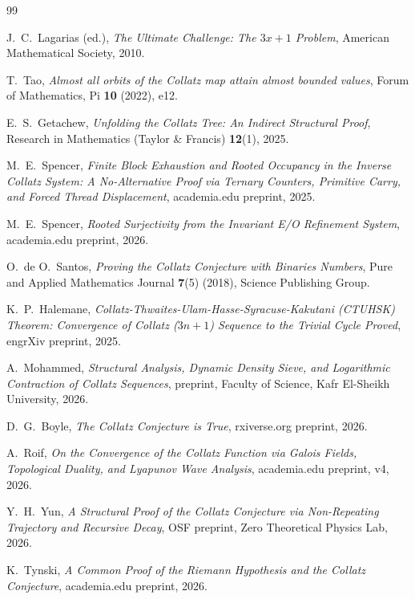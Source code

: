 \documentclass[11pt]{article}
\begin{document}
\begin{thebibliography}{99}

 J.\ C.\ Lagarias (ed.), \emph{The Ultimate
  Challenge: The $3x+1$ Problem}, American Mathematical Society, 2010.

 T.\ Tao, \emph{Almost all orbits of the Collatz map
  attain almost bounded values}, Forum of Mathematics, Pi \textbf{10}
  (2022), e12.

 E.\ S.\ Getachew, \emph{Unfolding the Collatz
  Tree: An Indirect Structural Proof}, Research in Mathematics
  (Taylor \& Francis) \textbf{12}(1), 2025.

 M.\ E.\ Spencer, \emph{Finite Block Exhaustion
  and Rooted Occupancy in the Inverse Collatz System: A No-Alternative
  Proof via Ternary Counters, Primitive Carry, and Forced Thread
  Displacement}, academia.edu preprint, 2025.

 M.\ E.\ Spencer, \emph{Rooted Surjectivity from
  the Invariant E/O Refinement System}, academia.edu preprint, 2026.

 O.\ de O.\ Santos, \emph{Proving the Collatz
  Conjecture with Binaries Numbers}, Pure and Applied Mathematics
  Journal \textbf{7}(5) (2018), Science Publishing Group.

 K.\ P.\ Halemane, \emph{Collatz-Thwaites-Ulam-Hasse-Syracuse-Kakutani
  (CTUHSK) Theorem: Convergence of Collatz ($3n+1$) Sequence to the
  Trivial Cycle Proved}, engrXiv preprint, 2025.

 A.\ Mohammed, \emph{Structural Analysis, Dynamic
  Density Sieve, and Logarithmic Contraction of Collatz Sequences},
  preprint, Faculty of Science, Kafr El-Sheikh University, 2026.

 D.\ G.\ Boyle, \emph{The Collatz Conjecture is
  True}, rxiverse.org preprint, 2026.

 A.\ Roif, \emph{On the Convergence of the Collatz
  Function via Galois Fields, Topological Duality, and Lyapunov Wave
  Analysis}, academia.edu preprint, v4, 2026.

 Y.\ H.\ Yun, \emph{A Structural Proof of the Collatz
  Conjecture via Non-Repeating Trajectory and Recursive Decay}, OSF
  preprint, Zero Theoretical Physics Lab, 2026.

 K.\ Tynski, \emph{A Common Proof of the Riemann
  Hypothesis and the Collatz Conjecture}, academia.edu preprint, 2026.


\end{thebibliography}
\end{document}
